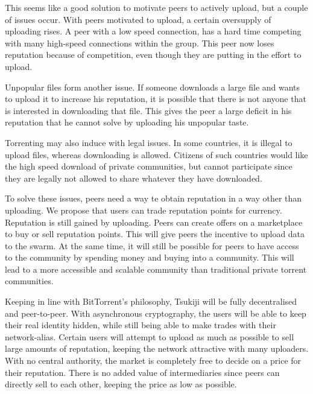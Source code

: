 This seems like a good solution to motivate peers to actively upload, but a couple of issues occur.\cite{bartercast}
With peers motivated to upload, a certain oversupply of uploading rises.
A peer with a low speed connection, has a hard time competing with many high-speed connections within the group.
This peer now loses reputation because of competition, even though they are putting in the effort to upload.

Unpopular files form another issue.
If someone downloads a large file and wants to upload it to increase his reputation, it is possible that there is not anyone that is interested in downloading that file.
This gives the peer a large deficit in his reputation that he cannot solve by uploading his unpopular taste.

Torrenting may also induce with legal issues. In some countries, it is illegal to upload files, whereas downloading is allowed.
Citizens of such countries would like the high speed download of private communities, but cannot participate since they are legally not allowed to share whatever they have downloaded.

To solve these issues, peers need a way te obtain reputation in a way other than uploading.
We propose that users can trade reputation points for currency.
Reputation is still gained by uploading.
Peers can create offers on a marketplace to buy or sell reputation points.
This will give peers the incentive to upload data to the swarm.
At the same time, it will still be possible for peers to have access to the community by spending money and buying into a community.
This will lead to a more accessible and scalable community than traditional private torrent communities.

Keeping in line with BitTorrent's philosophy, Tsukiji will be fully decentralised and peer-to-peer.
With asynchronous cryptography, the users will be able to keep their real identity hidden, while still being able to make trades with their network-alias.
Certain users will attempt to upload as much as possible to sell large amounts of reputation, keeping the network attractive with many uploaders.
With no central authority, the market is completely free to decide on a price for their reputation.
There is no added value of intermediaries since peers can directly sell to each other, keeping the price as low as possible.

